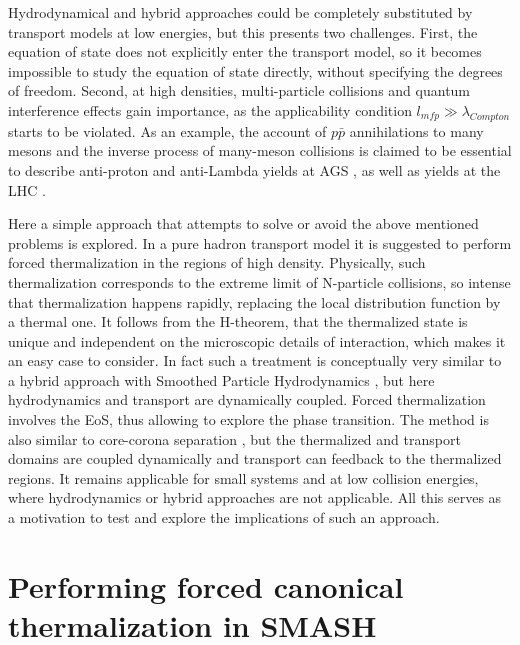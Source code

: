 Hydrodynamical and hybrid approaches could be completely substituted by
transport models at low energies, but this presents two challenges. First, the
equation of state does not explicitly enter the transport model, so it becomes
impossible to study the equation of state directly, without specifying the
degrees of freedom. Second, at high densities, multi-particle collisions and
quantum interference effects gain importance, as the applicability condition
$l_{mfp} \gg \lambda_{Compton}$ starts to be violated. As an example, the
account of $p\bar{p}$ annihilations to many mesons and the inverse process of
many-meson collisions is claimed to be essential to describe anti-proton and
anti-Lambda yields at AGS \cite{Cassing:2001ds}, as well as yields at the LHC
\cite{Pan:2014caa}.

Here a simple approach that attempts to solve or avoid the above mentioned
problems is explored. In a pure hadron transport model it is suggested to
perform forced thermalization in the regions of high density. Physically, such
thermalization corresponds to the extreme limit of N-particle collisions, so
intense that thermalization happens rapidly, replacing the local distribution
function by a thermal one. It follows from the H-theorem, that the thermalized
state is unique and independent on the microscopic details of interaction,
which makes it an easy case to consider. In fact such a treatment is
conceptually very similar to a hybrid approach with Smoothed Particle
Hydrodynamics \cite{Aguiar:2000hw}, but here hydrodynamics and transport are
dynamically coupled. Forced thermalization involves the EoS, thus allowing to
explore the phase transition. The method is also similar to core-corona
separation \cite{Steinheimer:2011mp}, but the thermalized and transport domains
are coupled dynamically and transport can feedback to the thermalized regions.
It remains applicable for small systems and at low collision energies, where
hydrodynamics or hybrid approaches are not applicable. All this serves as a
motivation to test and explore the implications of such an approach.

\section{Performing forced canonical thermalization in SMASH}
\label{methodology}


